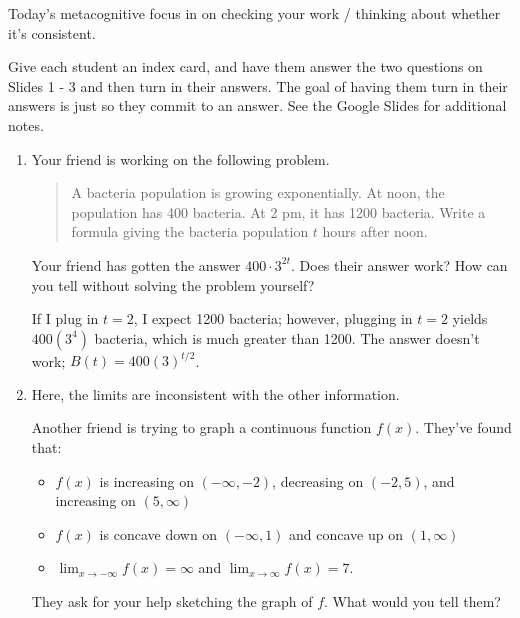 \documentclass{article}
\begin{document}

\begin{workshop}
  Today's metacognitive focus in on checking your work / thinking about whether it's consistent.

  Give each student an index card, and have them answer the two questions on Slides 1 - 3 and then turn in their answers. The goal of having them turn in their answers is just so they commit to an answer. See the Google Slides for additional notes. 
\end{workshop}

\begin{enumerate}
\item 
  \begin{problem}[\stretch{0.5}]
    Your friend is working on the following problem.

    \begin{quote}
      A bacteria population is growing exponentially. At noon, the population has 400 bacteria. At 2 pm, it has 1200 bacteria. Write a formula giving the bacteria population $t$ hours after noon.
    \end{quote}

    Your friend has gotten the answer $400 \cdot 3^{2t}$. Does their answer work? How can you tell without solving the problem yourself?
  \end{problem} 

  \begin{solution}
      If I plug in $t=2$, I expect 1200 bacteria; however, plugging in $t=2$ yields $400(3^4)$ bacteria, which is much greater than 1200. The answer doesn't work; $B(t)=400(3)^{t/2}$.
  \end{solution}

\item 

  \begin{workshop}
    Here, the limits are inconsistent with the other information. 
  \end{workshop}

  \begin{problem}[\vfill\newpage]
    Another friend is trying to graph a continuous function $f(x)$. They've found that:
    \begin{itemize}
    \item $f(x)$ is increasing on $(-\infty, -2)$, decreasing on $(-2, 5)$, and increasing on $(5, \infty)$
    \item $f(x)$ is concave down on $(-\infty, 1)$ and concave up on $(1, \infty)$
    \item $\displaystyle \lim_{x \to -\infty} f(x) = \infty$ and $\displaystyle \lim_{x \to \infty} f(x) = 7$.
    \end{itemize}
    They ask for your help sketching the graph of $f$. What would you tell them?
  \end{problem}


\end{enumerate}
\end{document}
